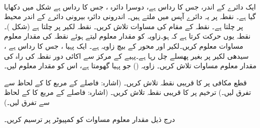 \\
ایک دائرے کے اندر،  جس کا رداس  ہے،  دوسرا دائرہ ، جس کا رداس  ہے شکل  میں دکھایا گیا ہے۔ نقطہ  پر یہ دائرے آپس میں ملتے ہیں۔ اندرونی دائرہ بیرونی دائرے کے اندر محیط پر چلتا ہے۔ نقطہ  کے مقام کی مساوات تلاش کریں۔
نقطہ  لکیر  پر چلتا ہے (شکل )۔ نقطہ  یوں حرکت کرتا ہے کہ  ہو۔زاویہ  کو مقدار معلوم لیتے ہوئے نقطہ  کی مقدار معلوم مساوات معلوم کریں۔لکیر  اور محور  کے بیچ زاویہ  ہے۔
ایک پہیا ، جس کا رداس  ہے  ، سیدھی لکیر پر بغیر پھسلے چل رہا ہے۔پہیے کے مرکز سے  اکائی دور نقطہ  کی راہ کی مقدار معلوم مساوات تلاش کریں۔  زاویہ ()    جو پہیا  گھومتا ہے،  اس کو مقدار معلوم لیں۔   


قطع مکافی  پر  کا قریبی نقطہ تلاش کریں۔ (اشارہ: فاصلے  کے مربع کا  کے لحاظ سے تفرق لیں۔)
ترخیم  پر  کا قریبی نقطہ تلاش کریں۔  (اشارہ: فاصلے  کے مربع کا  کے لحاظ سے تفرق لیں۔)


درج ذیل مقدار معلوم مساوات کو کمپیوٹر پر ترسیم کریں۔

